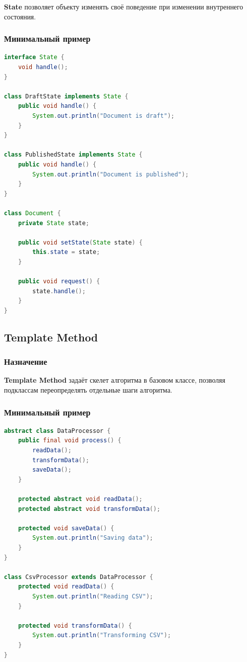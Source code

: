 \documentclass[12pt,a4paper]{article}
\begin{document}
\textbf{State} позволяет объекту изменять своё поведение при изменении внутреннего состояния.

\subsubsection{Минимальный пример}

\begin{lstlisting}[language=Java,caption={State}]
interface State {
    void handle();
}

class DraftState implements State {
    public void handle() {
        System.out.println("Document is draft");
    }
}

class PublishedState implements State {
    public void handle() {
        System.out.println("Document is published");
    }
}

class Document {
    private State state;

    public void setState(State state) {
        this.state = state;
    }

    public void request() {
        state.handle();
    }
}
\end{lstlisting}

\subsection{Template Method}

\subsubsection{Назначение}

\textbf{Template Method} задаёт скелет алгоритма в базовом классе, позволяя подклассам переопределять отдельные шаги алгоритма.

\subsubsection{Минимальный пример}

\begin{lstlisting}[language=Java,caption={Template Method}]
abstract class DataProcessor {
    public final void process() {
        readData();
        transformData();
        saveData();
    }

    protected abstract void readData();
    protected abstract void transformData();

    protected void saveData() {
        System.out.println("Saving data");
    }
}

class CsvProcessor extends DataProcessor {
    protected void readData() {
        System.out.println("Reading CSV");
    }

    protected void transformData() {
        System.out.println("Transforming CSV");
    }
}
\end{lstlisting}
\end{document}
